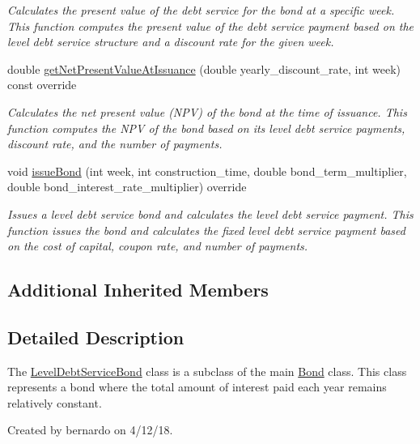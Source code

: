 \begin{DoxyCompactItemize}
\begin{DoxyCompactList}\small\item\em Calculates the present value of the debt service for the bond at a specific week. This function computes the present value of the debt service payment based on the level debt service structure and a discount rate for the given week. \end{DoxyCompactList}\item 
double \mbox{\hyperlink{classLevelDebtServiceBond_a0f5820c3e76b8b908dbe153a8291d96a}{get\+Net\+Present\+Value\+At\+Issuance}} (double yearly\+\_\+discount\+\_\+rate, int week) const override
\begin{DoxyCompactList}\small\item\em Calculates the net present value (N\+PV) of the bond at the time of issuance. This function computes the N\+PV of the bond based on its level debt service payments, discount rate, and the number of payments. \end{DoxyCompactList}\item 
void \mbox{\hyperlink{classLevelDebtServiceBond_a51a54a1a25be105b168bf86489aee417}{issue\+Bond}} (int week, int construction\+\_\+time, double bond\+\_\+term\+\_\+multiplier, double bond\+\_\+interest\+\_\+rate\+\_\+multiplier) override
\begin{DoxyCompactList}\small\item\em Issues a level debt service bond and calculates the level debt service payment. This function issues the bond and calculates the fixed level debt service payment based on the cost of capital, coupon rate, and number of payments. \end{DoxyCompactList}\end{DoxyCompactItemize}
\subsection*{Additional Inherited Members}


\subsection{Detailed Description}
The {\ttfamily \mbox{\hyperlink{classLevelDebtServiceBond}{Level\+Debt\+Service\+Bond}}} class is a subclass of the main {\ttfamily \mbox{\hyperlink{classBond}{Bond}}} class. This class represents a bond where the total amount of interest paid each year remains relatively constant. 

Created by bernardo on 4/12/18. 

